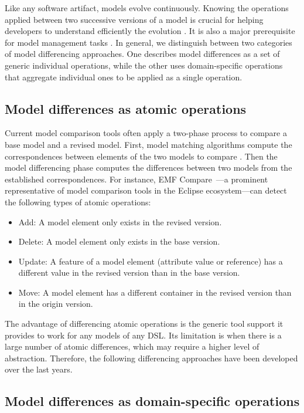 Like any software artifact, models evolve continuously.
Knowing the operations applied between two successive versions of a model is crucial for helping developers to understand efficiently the evolution .
It is also a major prerequisite for model management tasks .
In general, we distinguish between two categories of model differencing approaches.
One describes model differences as a set of generic individual operations, while the other uses domain-specific operations that aggregate individual ones to be applied as a single operation.

\subsection{Model differences as atomic operations}

Current model comparison tools often apply a two-phase process to compare a base model and a revised model.
First, model matching algorithms compute the correspondences between elements of the two models to compare .
Then the model differencing phase computes the differences between two models from the established correspondences.
For instance, EMF Compare~\cite{Brun2008}---a prominent representative of model comparison tools in the Eclipse ecosystem---can detect the following types of atomic operations:
%
\begin{itemize}%
  \item Add: A model element only exists in the revised version.
  \item Delete: A model element only exists in the base version.
  \item Update: A feature of a model element (attribute value or reference) has a different value in the revised version than in the base version.
  \item Move: A model element has a different container in the revised version than in the origin version.
\end{itemize}

The advantage of differencing atomic operations is the generic tool support it provides to work for any models of any DSL.
Its limitation is when there is a large number of atomic differences, which may require a higher level of abstraction.
Therefore, the following differencing approaches have been developed over the last years. 


\subsection{Model differences as domain-specific operations}

